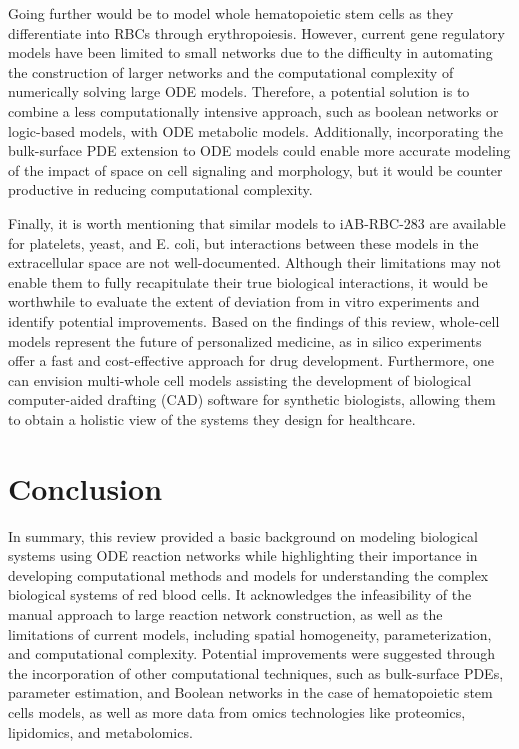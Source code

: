 \documentclass[conference]{IEEEtran}
\begin{document}
Going further would be to model whole hematopoietic stem cells as they differentiate into RBCs through erythropoiesis. However, current gene regulatory models have been limited to small networks due to the difficulty in automating the construction of larger networks and the computational complexity of numerically solving large ODE models\cite{b66, b67, b68, b69}. Therefore, a potential solution is to combine a less computationally intensive approach, such as boolean networks or logic-based models, with ODE metabolic models. Additionally, incorporating the bulk-surface PDE extension to ODE models could enable more accurate modeling of the impact of space on cell signaling and morphology, but it would be counter productive in reducing computational complexity.

Finally, it is worth mentioning that similar models to iAB-RBC-283 are available for platelets, yeast, and E. coli, but interactions between these models in the extracellular space are not well-documented\cite{b30}. Although their limitations may not enable them to fully recapitulate their true biological interactions, it would be worthwhile to evaluate the extent of deviation from in vitro experiments and identify potential improvements. Based on the findings of this review, whole-cell models represent the future of personalized medicine, as in silico experiments offer a fast and cost-effective approach for drug development. Furthermore, one can envision multi-whole cell models assisting the development of biological computer-aided drafting (CAD) software for synthetic biologists, allowing them to obtain a holistic view of the systems they design for healthcare.


\section{Conclusion}
In summary, this review provided a basic background on modeling biological systems using ODE reaction networks while highlighting their importance in developing computational methods and models for understanding the complex biological systems of red blood cells. It acknowledges the infeasibility of the manual approach to large reaction network construction, as well as the limitations of current models, including spatial homogeneity, parameterization, and computational complexity. Potential improvements were suggested through the incorporation of other computational techniques, such as bulk-surface PDEs, parameter estimation, and Boolean networks in the case of hematopoietic stem cells models, as well as more data from omics technologies like proteomics, lipidomics, and metabolomics.
\end{document}
